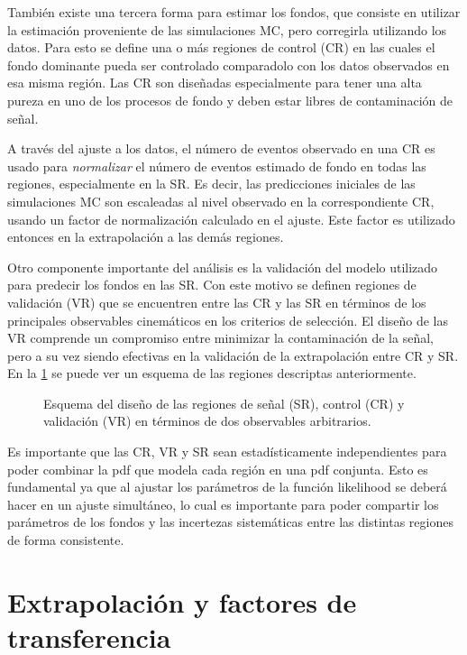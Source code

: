 También existe una tercera forma para estimar los fondos, que consiste en
utilizar la estimación proveniente de las simulaciones MC, pero corregirla
utilizando los datos. Para esto se define una o más regiones de control (CR) en
las cuales el fondo dominante pueda ser controlado comparadolo con los datos
observados en esa misma región. Las CR son diseñadas especialmente para tener
una alta pureza en uno de los procesos de fondo y deben estar libres de
contaminación de señal.

A través del ajuste a los datos, el número de eventos observado en una CR es
usado para \emph{normalizar} el número de eventos estimado de fondo en todas las
regiones, especialmente en la SR. Es decir, las predicciones iniciales de las
simulaciones MC son escaleadas al nivel observado en la correspondiente CR,
usando un factor de normalización calculado en el ajuste. Este factor es
utilizado entonces en la extrapolación a las demás regiones.

Otro componente importante del análisis es la validación del modelo utilizado
para predecir los fondos en las SR. Con este motivo se definen regiones de
validación (VR) que se encuentren entre las CR y las SR en términos de los
principales observables cinemáticos en los criterios de selección. El diseño de
las VR comprende un compromiso entre minimizar la contaminación de la señal, pero a su
vez siendo efectivas en la validación de la extrapolación entre CR y SR. En la
\cref{fig:regions_sketch} se puede ver un esquema de las regiones descriptas
anteriormente.

\begin{figure}[h]
  \centering 
  \caption{Esquema del diseño de las regiones de señal (SR), control (CR) y
    validación (VR) en términos de dos observables arbitrarios.}
  \label{fig:regions_sketch}
\end{figure}

Es importante que las CR, VR y SR sean estadísticamente independientes para
poder combinar la pdf que modela cada región en una pdf conjunta. Esto es
fundamental ya que al ajustar los parámetros de la función likelihood se deberá
hacer en un ajuste simultáneo, lo cual es importante para poder compartir los
parámetros de los fondos y las incertezas sistemáticas entre las distintas
regiones de forma consistente.

\section{Extrapolación y factores de transferencia}

